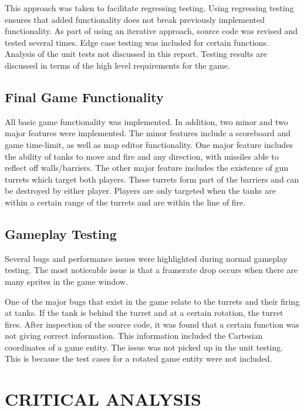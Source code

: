 \documentclass[10pt,twocolumn]{witseiepaper}
\begin{document}
This approach was taken to facilitate regressing testing. Using regressing testing ensures that added functionality does not break previously implemented functionality. As part of using an iterative approach, source code was revised and tested several times. Edge case testing was included for certain functions. Analysis of the unit tests not discussed in this report. Testing results are discussed in terms of the high level requirements for the game.

\subsection{Final Game Functionality}
All basic game functionality was implemented. In addition, two minor and two major features were implemented. The minor features include a scoreboard and game time-limit, as well as map editor functionality. One major feature includes the ability of tanks to move and fire and any direction, with missiles able to reflect off walls/barriers. The other major feature includes the existence of gun turrets which target both players. These turrets form part of the barriers and can be destroyed by either player. Players are only targeted when the tanks are within a certain range of the turrets and are within the line of fire.

\subsection{Gameplay Testing}
Several bugs and performance issues were highlighted during normal gameplay testing. The most noticeable issue is that a framerate drop occurs when there are many sprites in the game window. 

One of the major bugs that exist in the game relate to the turrets and their firing at tanks. If the tank is behind the turret and at a certain rotation, the turret fires. After inspection of the source code, it was found that a certain function was not giving correct information. This information included the Cartesian coordinates of a game entity. The issue was not picked up in the unit testing. This is because the test cases for a rotated game entity were not included. 


%
\section{CRITICAL ANALYSIS} %
\end{document}
